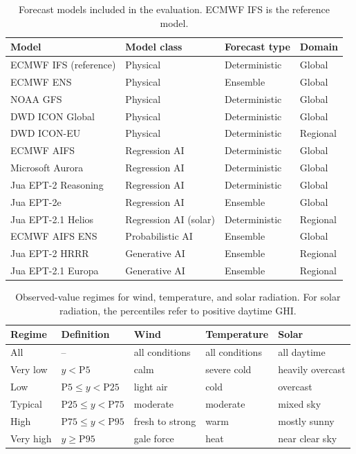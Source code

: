 \documentclass{article}
\newcommand{\numtable}[1]{%
  {\small\setlength{\tabcolsep}{6pt}\renewcommand{\arraystretch}{1.2}#1}%
}
\begin{document}
\begin{table}[htbp]
\centering
\caption{Forecast models included in the evaluation. ECMWF IFS is the
reference model.}
\label{tab:models}
\numtable{\begin{tabular}{llll}
\toprule
Model & Model class & Forecast type & Domain \\
\midrule
ECMWF IFS (reference) & Physical & Deterministic & Global \\
ECMWF ENS & Physical & Ensemble & Global \\
NOAA GFS & Physical & Deterministic & Global \\
DWD ICON Global & Physical & Deterministic & Global \\
DWD ICON-EU & Physical & Deterministic & Regional \\
\addlinespace
ECMWF AIFS & Regression AI & Deterministic & Global \\
Microsoft Aurora & Regression AI & Deterministic & Global \\
Jua EPT-2 Reasoning & Regression AI & Deterministic & Global \\
Jua EPT-2e & Regression AI & Ensemble & Global \\
Jua EPT-2.1 Helios & Regression AI (solar) & Deterministic & Regional \\
\addlinespace
ECMWF AIFS ENS & Probabilistic AI & Ensemble & Global \\
Jua EPT-2 HRRR & Generative AI & Ensemble & Regional \\
Jua EPT-2.1 Europa & Generative AI & Ensemble & Regional \\
\bottomrule
\end{tabular}}
\end{table}


\begin{table}[htbp]
\centering
\caption{Observed-value regimes for wind, temperature, and solar radiation.
For solar radiation, the percentiles refer to positive daytime GHI.}
\label{tab:regimes}
\numtable{\begin{tabular}{lllll}
\toprule
Regime & Definition & Wind & Temperature & Solar \\
\midrule
All       & --                          & all conditions  & all conditions & all daytime \\
Very low  & \(y<\mathrm{P5}\)                         & calm            & severe cold    & heavily overcast \\
Low       & \(\mathrm{P5}\leq y<\mathrm{P25}\)        & light air       & cold           & overcast \\
Typical   & \(\mathrm{P25}\leq y<\mathrm{P75}\)       & moderate        & moderate       & mixed sky \\
High      & \(\mathrm{P75}\leq y<\mathrm{P95}\)       & fresh to strong & warm           & mostly sunny \\
Very high & \(y\geq\mathrm{P95}\)                     & gale force      & heat           & near clear sky \\
\bottomrule
\end{tabular}}
\end{table}
\end{document}
